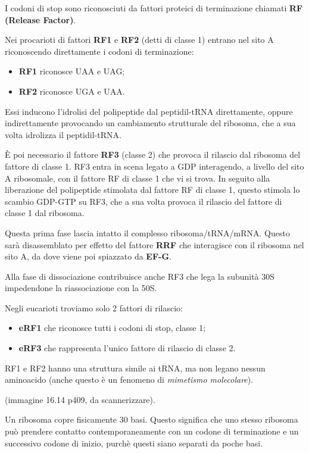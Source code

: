 \documentclass[11pt]{book}
\begin{document}
I codoni di stop sono riconosciuti da fattori proteici di terminazione
chiamati \textbf{RF (Release Factor)}.

Nei procarioti di fattori \textbf{RF1} e \textbf{RF2} (detti di classe
1) entrano nel sito A riconoscendo direttamente i codoni di
terminazione:

\begin{itemize}
\itemsep1pt\parskip0pt
\item
  \textbf{RF1} riconosce UAA e UAG;
\item
  \textbf{RF2} riconosce UGA e UAA.
\end{itemize}

Essi inducono l'idrolisi del polipeptide dal peptidil-tRNA direttamente,
oppure indirettamente provocando un cambiamento strutturale del
ribosoma, che a sua volta idrolizza il peptidil-tRNA.

È poi necessario il fattore \textbf{RF3} (classe 2) che provoca il
rilascio dal ribosoma del fattore di classe 1. RF3 entra in scena legato
a GDP interagendo, a livello del sito A ribosomale, con il fattore RF di
classe 1 che vi si trova. In seguito alla liberazione del polipeptide
stimolata dal fattore RF di classe 1, questo stimola lo scambio GDP-GTP
su RF3, che a sua volta provoca il rilascio del fattore di classe 1 dal
ribosoma.

Questa prima fase lascia intatto il complesso ribosoma/tRNA/mRNA. Questo
sarà disassemblato per effetto del fattore \textbf{RRF} che interagisce
con il ribosoma nel sito A, da dove viene poi spiazzato da
\textbf{EF-G}.

Alla fase di dissociazione contribuisce anche RF3 che lega la subunità
30S impedendone la riassociazione con la 50S.

Negli eucarioti troviamo solo 2 fattori di rilascio:

\begin{itemize}
\itemsep1pt\parskip0pt
\item
  \textbf{eRF1} che riconosce tutti i codoni di stop, classe 1;
\item
  \textbf{eRF3} che rappresenta l'unico fattore di rilascio di classe 2.
\end{itemize}

RF1 e RF2 hanno una struttura simile ai tRNA, ma non legano nessun
aminoacido (anche questo è un fenomeno di \emph{mimetismo molecolare}).

(immagine 16.14 p409, da scannerizzare).

Un ribosoma copre fisicamente 30 basi. Questo significa che uno stesso
ribosoma può prendere contatto contemporaneamente con un codone di
terminazione e un successivo codone di inizio, purchè questi siano
separati da poche basi.
\end{document}
